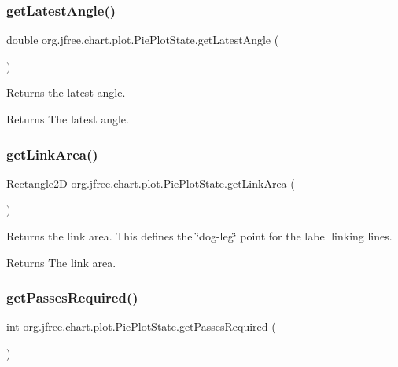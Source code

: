 \subsubsection{\texorpdfstring{get\+Latest\+Angle()}{getLatestAngle()}}
{\footnotesize\ttfamily double org.\+jfree.\+chart.\+plot.\+Pie\+Plot\+State.\+get\+Latest\+Angle (\begin{DoxyParamCaption}{ }\end{DoxyParamCaption})}

Returns the latest angle.

\begin{DoxyReturn}{Returns}
The latest angle. 
\end{DoxyReturn}
\mbox{\label{classorg_1_1jfree_1_1chart_1_1plot_1_1_pie_plot_state_a20821e8c1650c38338e7b38a1f17f1eb}} 
\subsubsection{\texorpdfstring{get\+Link\+Area()}{getLinkArea()}}
{\footnotesize\ttfamily Rectangle2D org.\+jfree.\+chart.\+plot.\+Pie\+Plot\+State.\+get\+Link\+Area (\begin{DoxyParamCaption}{ }\end{DoxyParamCaption})}

Returns the link area. This defines the \char`\"{}dog-\/leg\char`\"{} point for the label linking lines.

\begin{DoxyReturn}{Returns}
The link area. 
\end{DoxyReturn}
\mbox{\label{classorg_1_1jfree_1_1chart_1_1plot_1_1_pie_plot_state_a1c42afe172e40f3d0a485dd00c993fe1}} 
\subsubsection{\texorpdfstring{get\+Passes\+Required()}{getPassesRequired()}}
{\footnotesize\ttfamily int org.\+jfree.\+chart.\+plot.\+Pie\+Plot\+State.\+get\+Passes\+Required (\begin{DoxyParamCaption}{ }\end{DoxyParamCaption})}

